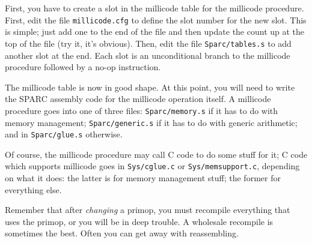 First, you have to create a slot in the millicode table for the millicode
procedure. First, edit the file {\tt millicode.cfg} to define the slot number
for the new slot. This is simple; just add one to the end of the file and
then update the count up at the top of the file (try it, it's obvious).
Then, edit the file {\tt Sparc/tables.s} to add another slot at the end.
Each slot is an unconditional branch to the millicode procedure followed
by a no-op instruction.

The millicode table is now in good shape. At this point, you will need to
write the SPARC assembly code for the millicode operation itself. A millicode
procedure goes into one of three files: {\tt Sparc/memory.s} if it has to
do with memory management; {\tt Sparc/generic.s} if it has to do with generic
arithmetic; and in {\tt Sparc/glue.s} otherwise.

Of course, the millicode procedure may call C code to do some stuff for it;
C code which supports millicode goes in {\tt Sys/cglue.c} or 
{\tt Sys/memsupport.c}, depending on what it does: the latter is for memory
management stuff; the former for everything else.

Remember that after {\em changing} a primop, you must recompile everything
that uses the primop, or you will be in deep trouble. A wholesale recompile
is sometimes the best. Often you can get away with reassembling.


